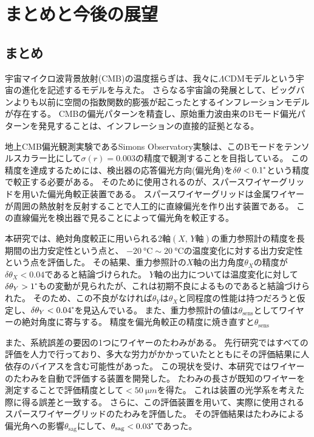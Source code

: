 \documentclass[../../main.tex]{subfiles}
\begin{document}
\chapter{まとめと今後の展望}
\section{まとめ}
宇宙マイクロ波背景放射(CMB)の温度揺らぎは、我々に$\Lambda \mathrm{CDM}$モデルという宇宙の進化を記述するモデルを与えた。
さらなる宇宙論の発展として、ビッグバンよりも以前に空間の指数関数的膨張が起こったとするインフレーションモデルが存在する。
CMBの偏光パターンを精査し、原始重力波由来のBモード偏光パターンを発見することは、インフレーションの直接的証拠となる。

地上CMB偏光観測実験であるSimons Observatory実験は、このBモードをテンソルスカラー比にして$\sigma(r)=0.003$の精度で観測することを目指している。
この精度を達成するためには、検出器の応答偏光方向(偏光角)を$\delta\theta<0.1\tcdegree$という精度で較正する必要がある。
そのために使用されるのが、スパースワイヤーグリッドを用いた偏光角較正装置である。
スパースワイヤーグリッドは金属ワイヤーが周囲の熱放射を反射することで人工的に直線偏光を作り出す装置である。
この直線偏光を検出器で見ることによって偏光角を較正する。

本研究では、絶対角度較正に用いられる2軸$(X,\,Y\text{軸})$の重力参照計の精度を長期間の出力安定性という点と、
$\SI{-20}{\degreeCelsius}\sim\SI{20}{\degreeCelsius}$の温度変化に対する出力安定性という点を評価した。
その結果、重力参照計の$X$軸の出力角度$\theta_{X}$の精度が$\delta\theta_{X}<0.04$であると結論づけられた。
$Y$軸の出力については温度変化に対して$\delta\theta_{Y}>1\tcdegree$もの変動が見られたが、これは初期不良によるものであると結論づけられた。
そのため、この不良がなければ$\theta_{Y}$は$\theta_{X}$と同程度の性能は持つだろうと仮定し、$\delta\theta_{Y}<0.04\tcdegree$を見込んでいる。
また、重力参照計の値は$\theta_{\mathrm{sens}}$としてワイヤーの絶対角度に寄与する。
精度を偏光角較正の精度に焼き直すと$\theta_{\mathrm{sens}}$

また、系統誤差の要因の1つにワイヤーのたわみがある。
先行研究ではすべての評価を人力で行っており、多大な労力がかかっていたとともにその評価結果に人依存のバイアスを含む可能性があった。
この現状を受け、本研究ではワイヤーのたわみを自動で評価する装置を開発した。
たわみの長さが既知のワイヤーを測定することで評価精度として$<\SI{50}{\micro m}$を得た。
これは装置の光学系を考えた際に得る誤差と一致する。
さらに、この評価装置を用いて、実際に使用されるスパースワイヤーグリッドのたわみを評価した。
その評価結果はたわみによる偏光角への影響$\theta_{\mathrm{sag}}$にして、$\theta_{\mathrm{sag}}<0.03\tcdegree$であった。
\end{document}
